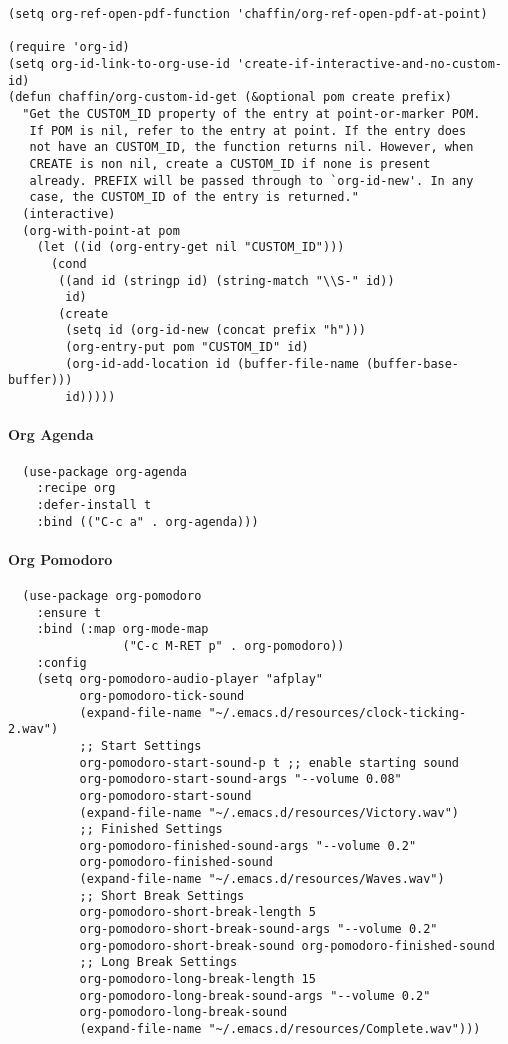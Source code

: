 \documentclass[11pt]{article}
\begin{document}
\begin{verbatim}
(setq org-ref-open-pdf-function 'chaffin/org-ref-open-pdf-at-point)

(require 'org-id)
(setq org-id-link-to-org-use-id 'create-if-interactive-and-no-custom-id)
(defun chaffin/org-custom-id-get (&optional pom create prefix)
  "Get the CUSTOM_ID property of the entry at point-or-marker POM.
   If POM is nil, refer to the entry at point. If the entry does
   not have an CUSTOM_ID, the function returns nil. However, when
   CREATE is non nil, create a CUSTOM_ID if none is present
   already. PREFIX will be passed through to `org-id-new'. In any
   case, the CUSTOM_ID of the entry is returned."
  (interactive)
  (org-with-point-at pom
    (let ((id (org-entry-get nil "CUSTOM_ID")))
      (cond
       ((and id (stringp id) (string-match "\\S-" id))
        id)
       (create
        (setq id (org-id-new (concat prefix "h")))
        (org-entry-put pom "CUSTOM_ID" id)
        (org-id-add-location id (buffer-file-name (buffer-base-buffer)))
        id)))))
\end{verbatim}

\paragraph*{Org Agenda}
\label{sec:org9a99710}

\begin{verbatim}
  (use-package org-agenda
    :recipe org
    :defer-install t
    :bind (("C-c a" . org-agenda)))
\end{verbatim}

\paragraph*{Org Pomodoro}
\label{sec:org98ba444}

\begin{verbatim}
  (use-package org-pomodoro
    :ensure t
    :bind (:map org-mode-map
                ("C-c M-RET p" . org-pomodoro))
    :config
    (setq org-pomodoro-audio-player "afplay"
          org-pomodoro-tick-sound
          (expand-file-name "~/.emacs.d/resources/clock-ticking-2.wav")
          ;; Start Settings
          org-pomodoro-start-sound-p t ;; enable starting sound
          org-pomodoro-start-sound-args "--volume 0.08"
          org-pomodoro-start-sound
          (expand-file-name "~/.emacs.d/resources/Victory.wav")
          ;; Finished Settings
          org-pomodoro-finished-sound-args "--volume 0.2"
          org-pomodoro-finished-sound
          (expand-file-name "~/.emacs.d/resources/Waves.wav")
          ;; Short Break Settings
          org-pomodoro-short-break-length 5
          org-pomodoro-short-break-sound-args "--volume 0.2"
          org-pomodoro-short-break-sound org-pomodoro-finished-sound
          ;; Long Break Settings
          org-pomodoro-long-break-length 15
          org-pomodoro-long-break-sound-args "--volume 0.2"
          org-pomodoro-long-break-sound
          (expand-file-name "~/.emacs.d/resources/Complete.wav")))
\end{verbatim}
\end{document}
